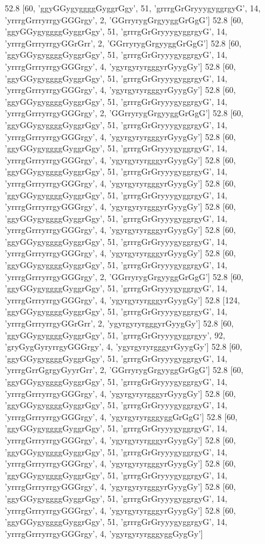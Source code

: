 52.8 [60, 'ggyGGygyggggGyggrGgy', 51, 'grrrgGrGryyygyggrgyG', 14, 'yrrrgGrrryrrgyGGGrgy', 2, 'GGrryrygGrgyyggGrGgG']
52.8 [60, 'ggyGGygyggggGyggrGgy', 51, 'grrrgGrGryyygyggrgyG', 14, 'yrrrgGrrryrrgyGGrGrr', 2, 'GGrryrygGrgyyggGrGgG']
52.8 [60, 'ggyGGygyggggGyggrGgy', 51, 'grrrgGrGryyygyggrgyG', 14, 'yrrrgGrrryrrgyGGGrgy', 4, 'ygyrgyryrgggyrGyygGy']
52.8 [60, 'ggyGGygyggggGyggrGgy', 51, 'grrrgGrGryyygyggrgyG', 14, 'yrrrgGrrryrrgyGGGrgy', 4, 'ygyrgyryrgggyrGyygGy']
52.8 [60, 'ggyGGygyggggGyggrGgy', 51, 'grrrgGrGryyygyggrgyG', 14, 'yrrrgGrrryrrgyGGGrgy', 2, 'GGrryrygGrgyyggGrGgG']
52.8 [60, 'ggyGGygyggggGyggrGgy', 51, 'grrrgGrGryyygyggrgyG', 14, 'yrrrgGrrryrrgyGGGrgy', 4, 'ygyrgyryrgggyrGyygGy']
52.8 [60, 'ggyGGygyggggGyggrGgy', 51, 'grrrgGrGryyygyggrgyG', 14, 'yrrrgGrrryrrgyGGGrgy', 4, 'ygyrgyryrgggyrGyygGy']
52.8 [60, 'ggyGGygyggggGyggrGgy', 51, 'grrrgGrGryyygyggrgyG', 14, 'yrrrgGrrryrrgyGGGrgy', 4, 'ygyrgyryrgggyrGyygGy']
52.8 [60, 'ggyGGygyggggGyggrGgy', 51, 'grrrgGrGryyygyggrgyG', 14, 'yrrrgGrrryrrgyGGGrgy', 4, 'ygyrgyryrgggyrGyygGy']
52.8 [60, 'ggyGGygyggggGyggrGgy', 51, 'grrrgGrGryyygyggrgyG', 14, 'yrrrgGrrryrrgyGGGrgy', 4, 'ygyrgyryrgggyrGyygGy']
52.8 [60, 'ggyGGygyggggGyggrGgy', 51, 'grrrgGrGryyygyggrgyG', 14, 'yrrrgGrrryrrgyGGGrgy', 4, 'ygyrgyryrgggyrGyygGy']
52.8 [60, 'ggyGGygyggggGyggrGgy', 51, 'grrrgGrGryyygyggrgyG', 14, 'yrrrgGrrryrrgyGGGrgy', 2, 'GGrryrygGrgyyggGrGgG']
52.8 [60, 'ggyGGygyggggGyggrGgy', 51, 'grrrgGrGryyygyggrgyG', 14, 'yrrrgGrrryrrgyGGGrgy', 4, 'ygyrgyryrgggyrGyygGy']
52.8 [124, 'ggyGGygyggggGyggrGgy', 51, 'grrrgGrGryyygyggrgyG', 14, 'yrrrgGrrryrrgyGGrGrr', 2, 'ygyrgyryrgggyrGyygGy']
52.8 [60, 'ggyGGygyggggGyggrGgy', 51, 'grrrgGrGryyygyggrgyy', 92, 'gryGygGyryrrgyGGGrgy', 4, 'ygyrgyryrgggyrGyygGy']
52.8 [60, 'ggyGGygyggggGyggrGgy', 51, 'grrrgGrGryyygyggrgyG', 14, 'yrrrgGrrGgrgyGyyrGrr', 2, 'GGrryrygGrgyyggGrGgG']
52.8 [60, 'ggyGGygyggggGyggrGgy', 51, 'grrrgGrGryyygyggrgyG', 14, 'yrrrgGrrryrrgyGGGrgy', 4, 'ygyrgyryrgggyrGyygGy']
52.8 [60, 'ggyGGygyggggGyggrGgy', 51, 'grrrgGrGryyygyggrgyG', 14, 'yrrrgGrrryrrgyGGGrgy', 4, 'ygyrgyryrgggyggGrGgG']
52.8 [60, 'ggyGGygyggggGyggrGgy', 51, 'grrrgGrGryyygyggrgyG', 14, 'yrrrgGrrryrrgyGGGrgy', 4, 'ygyrgyryrgggyrGyygGy']
52.8 [60, 'ggyGGygyggggGyggrGgy', 51, 'grrrgGrGryyygyggrgyG', 14, 'yrrrgGrrryrrgyGGGrgy', 4, 'ygyrgyryrgggyrGyygGy']
52.8 [60, 'ggyGGygyggggGyggrGgy', 51, 'grrrgGrGryyygyggrgyG', 14, 'yrrrgGrrryrrgyGGGrgy', 4, 'ygyrgyryrgggyrGyygGy']
52.8 [60, 'ggyGGygyggggGyggrGgy', 51, 'grrrgGrGryyygyggrgyG', 14, 'yrrrgGrrryrrgyGGGrgy', 4, 'ygyrgyryrgggyrGyygGy']
52.8 [60, 'ggyGGygyggggGyggrGgy', 51, 'grrrgGrGryyygyggrgyG', 14, 'yrrrgGrrryrrgyGGGrgy', 4, 'ygyrgyryrgggyggGygGy']
